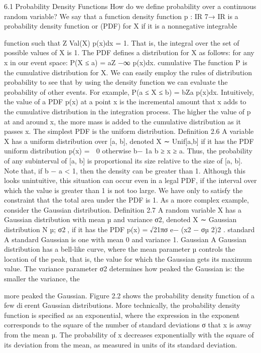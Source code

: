 6.1 Probability Density Functions
How do we define probability over a continuous random variable? We say that a function density function p : IR 7→ IR is a probability density function or (PDF) for X if it is a nonnegative integrable

function such that Z Val(X) p(x)dx = 1. That is, the integral over the set of possible values of X is 1. The PDF defines a distribution for X as follows: for any x in our event space: P(X ≤ a) = aZ −∞ p(x)dx. cumulative The function P is the cumulative distribution for X. We can easily employ the rules of distribution probability to see that by using the density function we can evaluate the probability of other events. For example, P(a ≤ X ≤ b) = bZa p(x)dx. Intuitively, the value of a PDF p(x) at a point x is the incremental amount that x adds to the cumulative distribution in the integration process. The higher the value of p at and around x, the more mass is added to the cumulative distribution as it passes x. The simplest PDF is the uniform distribution. Definition 2.6 A variable X has a uniform distribution over [a, b], denoted X ∼ Unif[a,b] if it has the PDF uniform distribution p(x) =  0 otherwise b− 1a b ≥ x ≥ a. Thus, the probability of any subinterval of [a, b] is proportional its size relative to the size of [a, b]. Note that, if b − a < 1, then the density can be greater than 1. Although this looks unintuitive, this situation can occur even in a legal PDF, if the interval over which the value is greater than 1 is not too large. We have only to satisfy the constraint that the total area under the PDF is 1. As a more complex example, consider the Gaussian distribution. Definition 2.7 A random variable X has a Gaussian distribution with mean µ and variance σ2, denoted X ∼ Gaussian distribution N µ; σ2, if it has the PDF p(x) = √21πσ e− (x2 − σµ 2)2 . standard A standard Gaussian is one with mean 0 and variance 1. Gaussian A Gaussian distribution has a bell-like curve, where the mean parameter µ controls the location of the peak, that is, the value for which the Gaussian gets its maximum value. The variance parameter σ2 determines how peaked the Gaussian is: the smaller the variance, the


more peaked the Gaussian. Figure 2.2 shows the probability density function of a few dierent Gaussian distributions. More technically, the probability density function is specified as an exponential, where the expression in the exponent corresponds to the square of the number of standard deviations σ that x is away from the mean µ. The probability of x decreases exponentially with the square of its deviation from the mean, as measured in units of its standard deviation.

